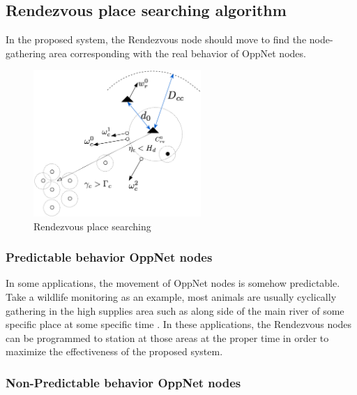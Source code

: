 \subsection{Rendezvous place searching algorithm}

In the proposed system, the Rendezvous node should move to find the node-gathering area corresponding with the real behavior of OppNet nodes.
%
\begin{figure}[!t]
	\centering
	\includegraphics[width=2.5in]{Figures/Dynamic.pdf}
	\caption{Rendezvous place searching}
	\label{Rendezvous node movements}
\end{figure}

\subsubsection{Predictable behavior OppNet nodes}

In some applications, the movement of OppNet nodes is somehow predictable.
Take a wildlife monitoring as an example, most animals are usually cyclically gathering in the high supplies area such as along side of the main river of some specific place at some specific time \cite{Yu2007}.
%
In these applications, the Rendezvous nodes can be programmed to station at those areas at the proper time in order to maximize the effectiveness of the proposed system.

\subsubsection{Non-Predictable behavior OppNet nodes}

